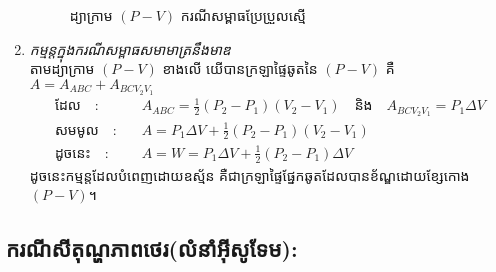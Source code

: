 \begin{enumerate}[m]
\begin{figure}[H]
			\caption{ដ្យាក្រាម $\left(P-V\right)$ ករណីសម្ពាធប្រែប្រួលស្មើ}
		\end{figure}
	\item \emph{\kml កម្មន្តក្នុងករណីសម្ពាធ​សមាមាត្រនឹងមាឌ}\\
	\quad តាមដ្យាក្រាម $\left(P-V\right)$ ខាងលើ យើបានក្រឡាផ្ទៃឆូតនៃ $\left(P-V\right)$ គឺ $A=A_{ABC}+A_{BCV_{2}V_{1}}$\\
	\begin{align*}
		\text{ដែល}\quad :&\quad A_{ABC}=\frac{1}{2}\left(P_2-P_1\right)\left(V_2-V_1\right)\quad \text{និង}\quad A_{BCV_2V_1}=P_1\Delta V\\
		\text{សមមូល}\quad :&\quad A=P_1\Delta V +\frac{1}{2}\left(P_2-P_1\right)\left(V_2-V_1\right)\\
		\text{ដូចនេះ}\quad :&\quad A=W=P_1\Delta V +\frac{1}{2}\left(P_2-P_1\right)\Delta V
	\end{align*}
	ដូចនេះកម្មន្តដែលបំពេញដោយឧស្ម័ន គឺជាក្រឡាផ្ទៃផ្នែកឆូតដែលបានខ័ណ្ឌដោយខ្សែកោង $\left(P-V\right)$។
	\end{enumerate}
	\subsection{ករណីសីតុណ្ហភាពថេរ(លំនាំអុីសូទែម):}

